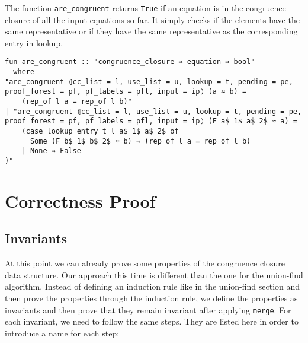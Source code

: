 The function \lstinline{are_congruent} returns \lstinline{True} if an equation is in the congruence closure of all the input equations so far. It simply checks if the elements have the same representative or if they have the same representative as the corresponding entry in lookup.

\begin{lstlisting}
fun are_congruent :: "congruence_closure ⇒ equation ⇒ bool"
  where
"are_congruent ⦇cc_list = l, use_list = u, lookup = t, pending = pe, proof_forest = pf, pf_labels = pfl, input = ip⦈ (a ≈ b) =
    (rep_of l a = rep_of l b)"
| "are_congruent ⦇cc_list = l, use_list = u, lookup = t, pending = pe, proof_forest = pf, pf_labels = pfl, input = ip⦈ (F a$_1$ a$_2$ ≈ a) =
    (case lookup_entry t l a$_1$ a$_2$ of
      Some (F b$_1$ b$_2$ ≈ b) ⇒ (rep_of l a = rep_of l b)
    | None ⇒ False
)"
\end{lstlisting}

\section{Correctness Proof}

\subsection{Invariants}

At this point we can already prove some properties of the congruence closure data structure. Our approach this time is different than the one for the union-find algorithm. Instead of defining an induction rule like in the union-find section and then prove the properties through the induction rule, we define the properties as invariants and then prove that they remain invariant after applying \lstinline|merge|. For each invariant, we need to follow the same steps. They are listed here in order to introduce a name for each step:

